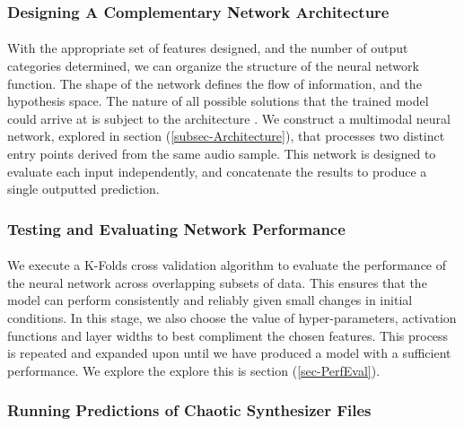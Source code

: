 \documentclass[12pt,letterpaper]{article}
\begin{document}

\subsubsection{Designing A Complementary Network Architecture}

\paragraph*{}With the appropriate set of features designed, and the number of output categories determined, we can organize the structure of the neural network function. The shape of the network defines the flow of information, and the hypothesis space. The nature of all possible solutions that the trained model could arrive at is subject to the architecture \cite{Goodfellow,Loy}. We construct a multimodal neural network, explored in section (\ref{subsec-Architecture}), that processes two distinct entry points derived from the same audio sample. This network is designed to evaluate each input independently, and concatenate the results to produce a single outputted prediction.


\subsubsection{Testing and Evaluating Network Performance}

\paragraph*{}We execute a K-Folds cross validation algorithm to evaluate the performance of the neural network across overlapping subsets of data. This ensures that the model can perform consistently and reliably given small changes in initial conditions. In this stage, we also choose the value of hyper-parameters, activation functions and layer widths to best compliment the chosen features. This process is repeated and expanded upon until we have produced a model with a sufficient performance. We explore the explore this is section (\ref{sec-PerfEval}).


\subsubsection{Running Predictions of Chaotic Synthesizer Files}
\end{document}
